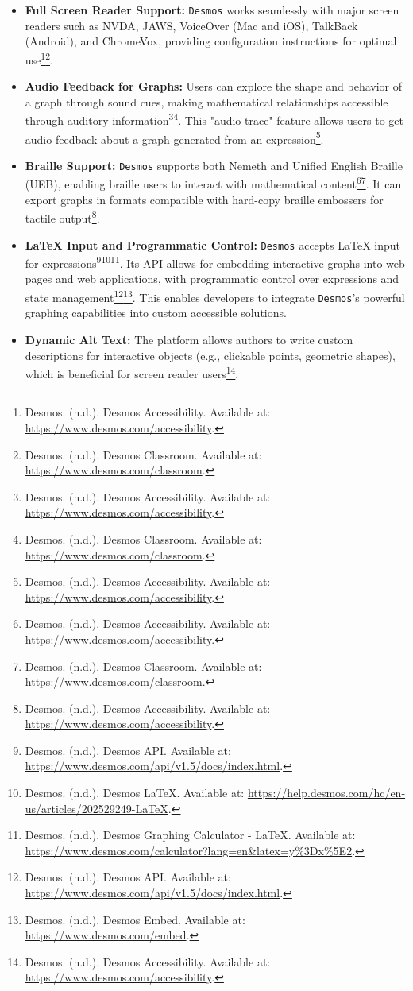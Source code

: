 \begin{itemize}
    \item \textbf{Full Screen Reader Support:} \texttt{Desmos} works seamlessly with major screen readers such as NVDA, JAWS, VoiceOver (Mac and iOS), TalkBack (Android), and ChromeVox, providing configuration instructions for optimal use\footnote{Desmos. (n.d.). Desmos Accessibility. Available at: \url{https://www.desmos.com/accessibility}.}\footnote{Desmos. (n.d.). Desmos Classroom. Available at: \url{https://www.desmos.com/classroom}.}.
    \item \textbf{Audio Feedback for Graphs:} Users can explore the shape and behavior of a graph through sound cues, making mathematical relationships accessible through auditory information\footnote{Desmos. (n.d.). Desmos Accessibility. Available at: \url{https://www.desmos.com/accessibility}.}\footnote{Desmos. (n.d.). Desmos Classroom. Available at: \url{https://www.desmos.com/classroom}.}. This "audio trace" feature allows users to get audio feedback about a graph generated from an expression\footnote{Desmos. (n.d.). Desmos Accessibility. Available at: \url{https://www.desmos.com/accessibility}.}.
    \item \textbf{Braille Support:} \texttt{Desmos} supports both Nemeth and Unified English Braille (UEB), enabling braille users to interact with mathematical content\footnote{Desmos. (n.d.). Desmos Accessibility. Available at: \url{https://www.desmos.com/accessibility}.}\footnote{Desmos. (n.d.). Desmos Classroom. Available at: \url{https://www.desmos.com/classroom}.}. It can export graphs in formats compatible with hard-copy braille embossers for tactile output\footnote{Desmos. (n.d.). Desmos Accessibility. Available at: \url{https://www.desmos.com/accessibility}.}.
    \item \textbf{LaTeX Input and Programmatic Control:} \texttt{Desmos} accepts LaTeX input for expressions\footnote{Desmos. (n.d.). Desmos API. Available at: \url{https://www.desmos.com/api/v1.5/docs/index.html}.}\footnote{Desmos. (n.d.). Desmos LaTeX. Available at: \url{https://help.desmos.com/hc/en-us/articles/202529249-LaTeX}.}\footnote{Desmos. (n.d.). Desmos Graphing Calculator - LaTeX. Available at: \url{https://www.desmos.com/calculator?lang=en&latex=y%3Dx%5E2}.}. Its API allows for embedding interactive graphs into web pages and web applications, with programmatic control over expressions and state management\footnote{Desmos. (n.d.). Desmos API. Available at: \url{https://www.desmos.com/api/v1.5/docs/index.html}.}\footnote{Desmos. (n.d.). Desmos Embed. Available at: \url{https://www.desmos.com/embed}.}. This enables developers to integrate \texttt{Desmos}'s powerful graphing capabilities into custom accessible solutions.
    \item \textbf{Dynamic Alt Text:} The platform allows authors to write custom descriptions for interactive objects (e.g., clickable points, geometric shapes), which is beneficial for screen reader users\footnote{Desmos. (n.d.). Desmos Accessibility. Available at: \url{https://www.desmos.com/accessibility}.}.
\end{itemize}
